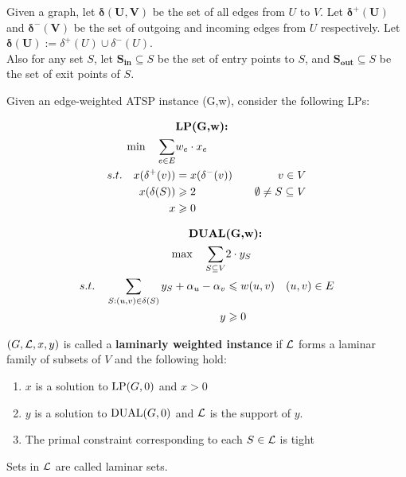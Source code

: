 \documentclass[./main.tex]{subfiles}
\begin{document}
	\begin{definition}
		Given a graph, let $\bm{\delta(U,V)}$ be the set of all edges from $U$ to $V$.
		Let $\bm{\delta^+(U)}$ and $\bm{\delta^-(V)}$ be the set of outgoing and incoming edges from $U$ respectively.
		Let $\bm{\delta(U)}:=\delta^+(U)\cup \delta^-(U)$.
		\\Also for any set $S$, let $\bm{S_{in}}\subseteq S$ be the set of entry points to $S$, and $\bm{S_{out}}\subseteq S$ be the set of exit points of $S$.
	\end{definition}\vspace{4mm}

	\begin{definition}
		Given an edge-weighted ATSP instance (G,w), consider the following LPs:\\
		\begin{minipage}{0.20\textwidth}
			\begin{align*}
				&\textbf{\textup{LP}(G,w):}\\
				\min\quad\sum_{e\in E}&w_e\cdot x_e\\
				s.t.\quad x(\delta^+(v)) & = x(\delta^-(v))\quad & v\in V                     \\
				x(\delta(S))             & \geqslant 2\quad           & \emptyset\neq S\subseteq V \\
				x&\geqslant 0
			\end{align*}
		\end{minipage}
		\hfill\vline\hfill
		\begin{minipage}{0.55\textwidth}
			\begin{align*}
				\textbf{\textup{DUAL}}                                                 & \textbf{(G,w):}             \\
				\max\quad\sum_{S\subseteq V}                                  & 2\cdot y_S                  \\
				s.t.\quad\sum_{S:(u,v)\in \delta(S)}y_S + \alpha_u - \alpha_v & \leqslant w(u,v)\quad (u,v)\in E \\
				y                                                             & \geqslant 0
			\end{align*}
		\end{minipage}
		\vspace{7mm}
	\end{definition}

	\begin{definition}
		$(G,\mathcal{L},x,y)$ is called a \textbf{laminarly weighted instance} if $\mathcal{L}$ forms a laminar family of subsets of $V$ and the following hold:
		\begin{enumerate}
			\item $x$ is a solution to $\textup{LP}(G,0)$ and $x > 0$
			\item $y$ is a solution to $\textup{DUAL}(G,0)$ and $\mathcal{L}$ is the support of $y$.
			\item The primal constraint corresponding to each $S\in \mathcal{L}$ is tight
		\end{enumerate}
		Sets in $\mathcal{L}$ are called laminar sets.
	\end{definition}
\end{document}
